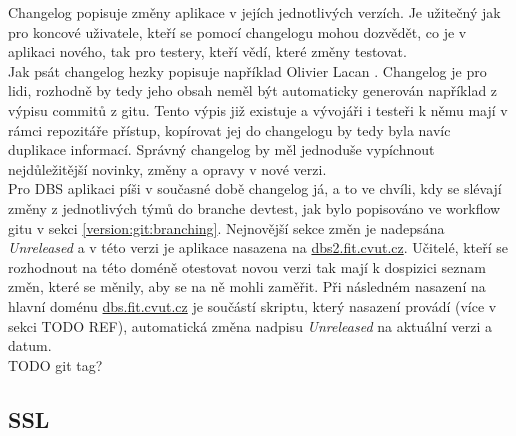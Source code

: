 Changelog popisuje změny aplikace v jejích jednotlivých verzích. Je užitečný jak pro koncové uživatele, kteří se pomocí changelogu mohou dozvědět, co je v aplikaci nového, tak pro testery, kteří vědí, které změny testovat.\\
Jak psát changelog hezky popisuje například Olivier Lacan \cite{changelog}. Changelog je pro lidi, rozhodně by tedy jeho obsah neměl být automaticky generován například z výpisu commitů z gitu. Tento výpis již existuje a vývojáři i testeři k němu mají v rámci repozitáře přístup, kopírovat jej do changelogu by tedy byla navíc duplikace informací. Správný changelog by měl jednoduše vypíchnout nejdůležitější novinky, změny a opravy v nové verzi.\\
Pro DBS aplikaci píši v současné době changelog já, a to ve chvíli, kdy se slévají změny z jednotlivých týmů do branche devtest, jak bylo popisováno ve workflow gitu v sekci \ref{version:git:branching}. Nejnovější sekce změn je nadepsána \emph{Unreleased} a v této verzi je aplikace nasazena na \url{dbs2.fit.cvut.cz}. Učitelé, kteří se rozhodnout na této doméně otestovat novou verzi tak mají k dospizici seznam změn, které se měnily, aby se na ně mohli zaměřit. Při následném nasazení na hlavní doménu \url{dbs.fit.cvut.cz} je součástí skriptu, který nasazení provádí (více v sekci TODO REF), automatická změna nadpisu \emph{Unreleased} na aktuální verzi a datum.\\
TODO git tag?

\subsection{SSL}

